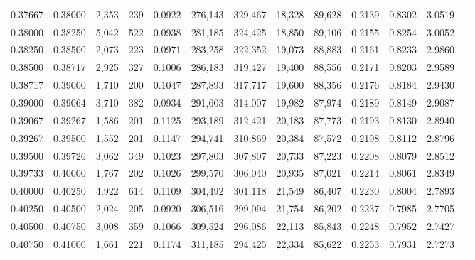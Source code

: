 \begin{tabular}{rrrrrrrrrrrrr}
0.37667 & 0.38000 & 2,353 & 239 &                                     0.0922 & 276,143 & 329,467 &  18,328 &  89,628 & 0.2139 & 0.8302 & 3.0519 \\
0.38000 & 0.38250 & 5,042 & 522 &                                     0.0938 & 281,185 & 324,425 &  18,850 &  89,106 & 0.2155 & 0.8254 & 3.0052 \\
0.38250 & 0.38500 & 2,073 & 223 &                                     0.0971 & 283,258 & 322,352 &  19,073 &  88,883 & 0.2161 & 0.8233 & 2.9860 \\
0.38500 & 0.38717 & 2,925 & 327 &                                     0.1006 & 286,183 & 319,427 &  19,400 &  88,556 & 0.2171 & 0.8203 & 2.9589 \\
0.38717 & 0.39000 & 1,710 & 200 &                                     0.1047 & 287,893 & 317,717 &  19,600 &  88,356 & 0.2176 & 0.8184 & 2.9430 \\
0.39000 & 0.39064 & 3,710 & 382 &                                     0.0934 & 291,603 & 314,007 &  19,982 &  87,974 & 0.2189 & 0.8149 & 2.9087 \\
0.39067 & 0.39267 & 1,586 & 201 &                                     0.1125 & 293,189 & 312,421 &  20,183 &  87,773 & 0.2193 & 0.8130 & 2.8940 \\
0.39267 & 0.39500 & 1,552 & 201 &                                     0.1147 & 294,741 & 310,869 &  20,384 &  87,572 & 0.2198 & 0.8112 & 2.8796 \\
0.39500 & 0.39726 & 3,062 & 349 &                                     0.1023 & 297,803 & 307,807 &  20,733 &  87,223 & 0.2208 & 0.8079 & 2.8512 \\
0.39733 & 0.40000 & 1,767 & 202 &                                     0.1026 & 299,570 & 306,040 &  20,935 &  87,021 & 0.2214 & 0.8061 & 2.8349 \\
0.40000 & 0.40250 & 4,922 & 614 &                                     0.1109 & 304,492 & 301,118 &  21,549 &  86,407 & 0.2230 & 0.8004 & 2.7893 \\
0.40250 & 0.40500 & 2,024 & 205 &                                     0.0920 & 306,516 & 299,094 &  21,754 &  86,202 & 0.2237 & 0.7985 & 2.7705 \\
0.40500 & 0.40750 & 3,008 & 359 &                                     0.1066 & 309,524 & 296,086 &  22,113 &  85,843 & 0.2248 & 0.7952 & 2.7427 \\
0.40750 & 0.41000 & 1,661 & 221 &                                     0.1174 & 311,185 & 294,425 &  22,334 &  85,622 & 0.2253 & 0.7931 & 2.7273 \\

\end{tabular}
